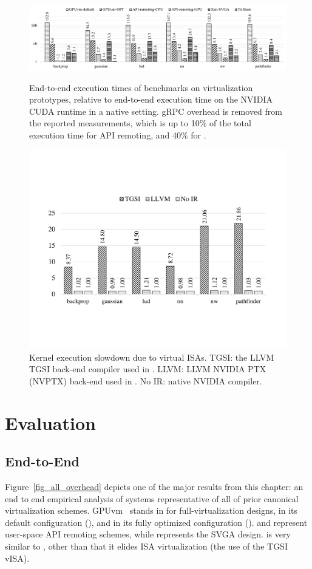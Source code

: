 \begin{figure}
	\centering

	\includegraphics[width=\linewidth,clip]{trillium/data/cross_product_overhead_noRPC_OptInit.pdf}
	\caption{{\footnotesize End-to-end execution times of benchmarks on virtualization prototypes, relative to end-to-end execution time on the NVIDIA CUDA runtime in a native setting. gRPC overhead is removed from the reported measurements, which is up to 10\% of the total execution time for API remoting, and 40\% for \Trillium.}}
	\label{fig_all_overhead}

	\includegraphics[width=.5\linewidth,trim={2cm 4.5cm 2cm 5cm},clip]{trillium/data/trillium/trillium_kernel.pdf}
	\caption{{\footnotesize Kernel execution slowdown due to virtual ISAs. TGSI: the LLVM TGSI back-end compiler used in \XenSVGA. LLVM: LLVM NVIDIA PTX (NVPTX) back-end used in \Trillium. No IR: native NVIDIA compiler.}}
	\label{fig_trillium_kernel}

\end{figure}

\section{Evaluation}
\label{sec:trilliumeval}

\subsection{End-to-End}
Figure~\ref{fig_all_overhead} depicts one of the major results from this
chapter: an end to end empirical analysis of systems representative of all of
prior canonical virtualization schemes. GPUvm~\cite{GPUvm} stands in for
full-virtual\-ization designs, in its default configuration (\gpuvmdef), and
in its fully optimized configuration (\gpuvmopt). \apigpu and \apicpu
represent user-space API remoting schemes, while \XenSVGA represents the SVGA
design. \Trillium is very similar to \XenSVGA, other than that it elides ISA
virtualization (the use of the TGSI vISA).

